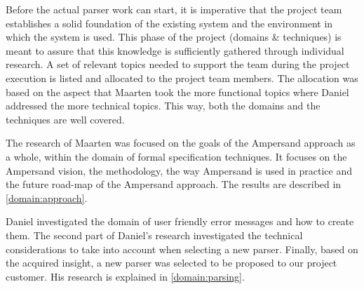 
Before the actual parser work can start, it is imperative that the project team establishes a solid foundation of the existing system and the environment in which the system is used.
This phase of the project (domains \& techniques) is meant to assure that this knowledge is sufficiently gathered through individual research.
A set of relevant topics needed to support the team during the project execution is listed and allocated to the project team members.
The allocation was based on the aspect that Maarten took the more functional topics where Daniel addressed the more technical topics.
This way, both the domains and the techniques are well covered.

The research of Maarten was focused on the goals of the Ampersand approach as a whole, within the domain of formal specification techniques.
It focuses on the Ampersand vision, the methodology, the way Ampersand is used in practice and the future road-map of the Ampersand approach.
The results are described in \autoref{domain:approach}.

Daniel investigated the domain of user friendly error messages and how to create them.
The second part of Daniel's research investigated the technical considerations to take into account when selecting a new parser.
Finally, based on the acquired insight, a new parser was selected to be proposed to our project customer.
His research is explained in \autoref{domain:parsing}.
